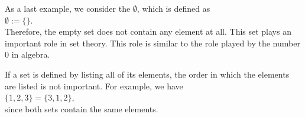 As a last example, we consider the  $\emptyset$, which is defined as
\\[0.2cm]
\hspace*{1.3cm}
$\emptyset := \{\}$.
\\[0.2cm]
Therefore, the empty set does not contain any element at all.  This set plays an important role in set theory.  This
role is similar to the role played by the number $0$ in algebra.

If a set is defined by listing all of its elements, the order in which the
elements are listed is not important.  For example, we have
\\[0.2cm]
\hspace*{1.3cm}
$\{1,2,3\} = \{3,1,2\}$,
\\[0.2cm]
since both sets contain the same elements.


